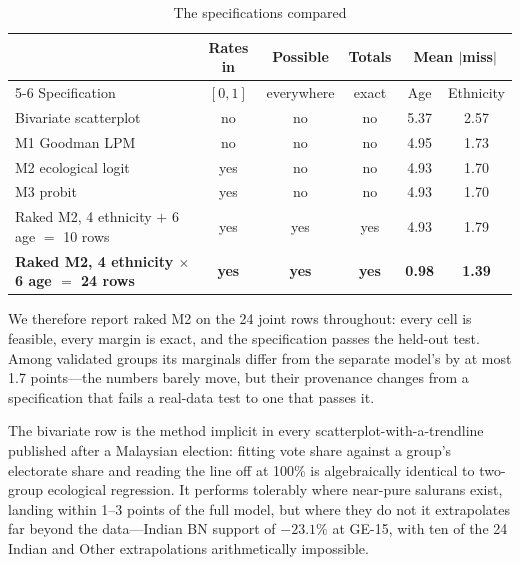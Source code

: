 \documentclass[11pt]{article}
\begin{document}
\begin{table}[!htb]
	\caption{The specifications compared}
	\label{tab:models}
	\centering
	\footnotesize
	\setlength{\tabcolsep}{3pt}
	\begin{tabular}{lccccc}
		\toprule
		                                                          & Rates in     & Possible     & Totals       & \multicolumn{2}{c}{Mean $|$miss$|$}                 \\
		\cmidrule(lr){5-6}
		Specification                                             & $[0,1]$      & everywhere   & exact        & Age                                 & Ethnicity     \\
		\midrule
		Bivariate scatterplot                                     & no           & no           & no           & 5.37                                & 2.57          \\
		M1 Goodman LPM                                            & no           & no           & no           & 4.95                                & 1.73          \\
		M2 ecological logit                                       & yes          & no           & no           & 4.93                                & 1.70          \\
		M3 probit                                                 & yes          & no           & no           & 4.93                                & 1.70          \\
		Raked M2, 4 ethnicity $+$ 6 age $=$ 10 rows               & yes          & yes          & yes          & 4.93                                & 1.79          \\
		\textbf{Raked M2, 4 ethnicity $\times$ 6 age $=$ 24 rows} & \textbf{yes} & \textbf{yes} & \textbf{yes} & \textbf{0.98}                       & \textbf{1.39} \\
		\bottomrule
	\end{tabular}
\end{table}

We therefore report raked M2 on the 24 joint rows throughout: every cell is feasible, every margin is exact, and the specification passes the held-out test. Among validated groups its marginals differ from the separate model's by at most 1.7 points---the numbers barely move, but their provenance changes from a specification that fails a real-data test to one that passes it.

The bivariate row is the method implicit in every scatterplot-with-a-trendline published after a Malaysian election: fitting vote share against a group's electorate share and reading the line off at 100\% is algebraically identical to two-group ecological regression. It performs tolerably where near-pure salurans exist, landing within 1--3 points of the full model, but where they do not it extrapolates far beyond the data---Indian BN support of $-23.1\%$ at GE-15, with ten of the 24 Indian and Other extrapolations arithmetically impossible.
\end{document}
